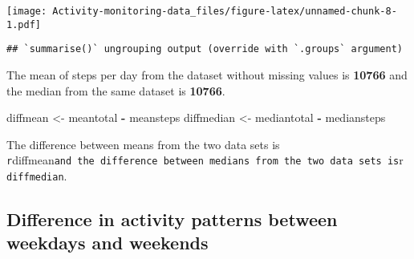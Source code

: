 \documentclass[]{article}
\newenvironment{Shaded}{\begin{snugshade}}{\end{snugshade}}
\newcommand{\KeywordTok}[1]{\textcolor[rgb]{0.13,0.29,0.53}{\textbf{#1}}}
\newcommand{\DataTypeTok}[1]{\textcolor[rgb]{0.13,0.29,0.53}{#1}}
\newcommand{\StringTok}[1]{\textcolor[rgb]{0.31,0.60,0.02}{#1}}
\newcommand{\OperatorTok}[1]{\textcolor[rgb]{0.81,0.36,0.00}{\textbf{#1}}}
\newcommand{\NormalTok}[1]{#1}
\begin{document}
\texttt{[image: Activity-monitoring-data\_files/figure-latex/unnamed-chunk-8-1.pdf]}

\begin{Shaded}
\end{Shaded}

\begin{verbatim}
## `summarise()` ungrouping output (override with `.groups` argument)
\end{verbatim}

\begin{Shaded}
\end{Shaded}

The mean of steps per day from the dataset without missing values is
\textbf{10766} and the median from the same dataset is \textbf{10766}.

\begin{Shaded}
\begin{Highlighting}[]
\NormalTok{diffmean <-}\StringTok{ }\NormalTok{meantotal }\OperatorTok{-}\StringTok{ }\NormalTok{meansteps}
\NormalTok{diffmedian <-}\StringTok{ }\NormalTok{mediantotal }\OperatorTok{-}\StringTok{ }\NormalTok{mediansteps}
\end{Highlighting}
\end{Shaded}

The difference between means from the two data sets is
\texttt{r}diffmean\texttt{and\ the\ difference\ between\ medians\ from\ the\ two\ data\ sets\ is}r
\texttt{diffmedian}.

\subsection{Difference in activity patterns between weekdays and
weekends}\label{difference-in-activity-patterns-between-weekdays-and-weekends}
\end{document}
